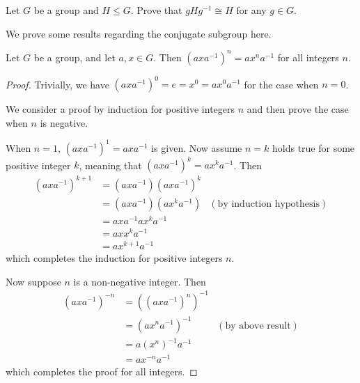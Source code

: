 \begin{exercise}\label{exercise-conjugate-subgroup-isomorphic-to-subgroup}
    Let $G$ be a group and $H \leq G$. Prove that $gHg^{-1} \cong H$ for any $g \in G$.
\end{exercise}

We prove some results regarding the conjugate subgroup here.
\begin{proposition}\label{prop-power-of-conjugate-equals-conjugate-of-power}
    Let $G$ be a group, and let $a, x \in G$. Then $(axa^{-1})^n = ax^na^{-1}$ for all integers $n$.
\end{proposition}
\begin{proof}
    Trivially, we have $\left(axa^{-1}\right)^0 = e = x^0 = ax^0a^{-1}$ for the case when $n = 0$.

    We consider a proof by induction for positive integers $n$ and then prove the case when $n$ is negative.

    When $n = 1$, $\left(axa^{-1}\right)^1 = axa^{-1}$ is given. Now assume $n = k$ holds true for some positive integer $k$, meaning that $\left(axa^{-1}\right)^k = ax^ka^{-1}$. Then
    \begin{align*}
        \left(axa^{-1}\right)^{k+1} &= \left(axa^{-1}\right)\left(axa^{-1}\right)^k\\
        &= \left(axa^{-1}\right)\left(ax^ka^{-1}\right) & (\text{by induction hypothesis})\\
        &= axa^{-1}ax^ka^{-1}\\
        &= axx^ka^{-1}\\
        &= ax^{k+1}a^{-1}
    \end{align*}
    which completes the induction for positive integers $n$.

    Now suppose $n$ is a non-negative integer. Then
    \begin{align*}
        \left(axa^{-1}\right)^{-n} &= \left(\left(axa^{-1}\right)^n\right)^{-1}\\
        &= \left(ax^na^{-1}\right)^{-1} & (\text{by above result})\\
        &= a\left(x^n\right)^{-1}a^{-1}\\
        &= ax^{-n}a^{-1}
    \end{align*}
    which completes the proof for all integers.
\end{proof}

